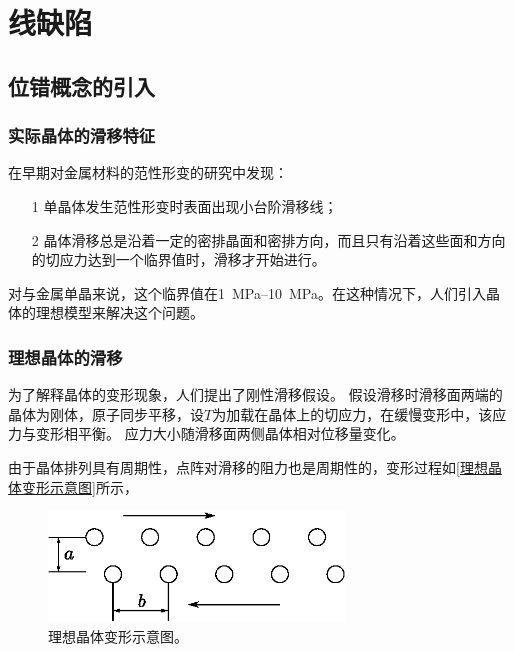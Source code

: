 \chapter{线缺陷}
    \section{位错概念的引入}
        \subsection{实际晶体的滑移特征}
            在早期对金属材料的范性形变的研究中发现：
            \begin{itemize}
                \item[1] 单晶体发生范性形变时表面出现小台阶滑移线；
                \item[2] 晶体滑移总是沿着一定的密排晶面和密排方向，而且只有沿着这些面和方向的切应力达到一个临界值时，滑移才开始进行。
            \end{itemize}
            对与金属单晶来说，这个临界值在\SIrange{1}{10}{\MPa}。在这种情况下，人们引入晶体的理想模型来解决这个问题。

        \subsection{理想晶体的滑移}
            为了解释晶体的变形现象，人们提出了刚性滑移假设。
            假设滑移时滑移面两端的晶体为刚体，原子同步平移，设$T$为加载在晶体上的切应力，在缓慢变形中，该应力与变形相平衡。
            应力大小随滑移面两侧晶体相对位移量变化。

            由于晶体排列具有周期性，点阵对滑移的阻力也是周期性的，变形过程如\autoref{理想晶体变形示意图}所示，
            \begin{figure}[ht]
                \centering
                \includegraphics[width=0.7\textwidth]{fig/deformation_of_ideal_crystal.eps}
                \caption{理想晶体变形示意图。}
                \label{理想晶体变形示意图}
            \end{figure}
            
